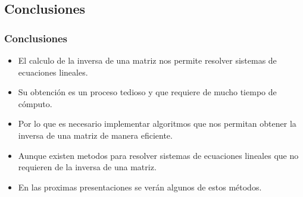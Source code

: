 \documentclass{beamer}
\begin{document}
    \subsection{Conclusiones}
    \begin{frame}
        \frametitle{Conclusiones}
        \begin{itemize}
            \item El calculo de la inversa de una matriz nos permite resolver sistemas de ecuaciones lineales.\\
            \item Su obtención es un proceso tedioso y que requiere de mucho tiempo de cómputo.\\
            \item Por lo que es necesario implementar algoritmos que nos permitan obtener la inversa de una matriz de manera eficiente.\\
            \item Aunque existen metodos para resolver sistemas de ecuaciones lineales que no requieren de la inversa de una matriz.\\
            \item En las proximas presentaciones se verán algunos de estos métodos.
        \end{itemize}
    \end{frame}
\end{document}
